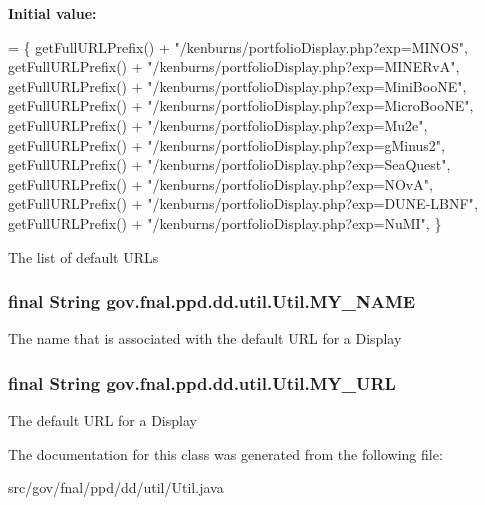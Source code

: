 {\bfseries Initial value\-:}
\begin{DoxyCode}
= \{ getFullURLPrefix() + \textcolor{stringliteral}{"/kenburns/portfolioDisplay.php?exp=MINOS"},
            getFullURLPrefix() + \textcolor{stringliteral}{"/kenburns/portfolioDisplay.php?exp=MINERvA"},
            getFullURLPrefix() + \textcolor{stringliteral}{"/kenburns/portfolioDisplay.php?exp=MiniBooNE"},
            getFullURLPrefix() + \textcolor{stringliteral}{"/kenburns/portfolioDisplay.php?exp=MicroBooNE"},
            getFullURLPrefix() + \textcolor{stringliteral}{"/kenburns/portfolioDisplay.php?exp=Mu2e"},
            getFullURLPrefix() + \textcolor{stringliteral}{"/kenburns/portfolioDisplay.php?exp=gMinus2"},
            getFullURLPrefix() + \textcolor{stringliteral}{"/kenburns/portfolioDisplay.php?exp=SeaQuest"},
            getFullURLPrefix() + \textcolor{stringliteral}{"/kenburns/portfolioDisplay.php?exp=NOvA"},
            getFullURLPrefix() + \textcolor{stringliteral}{"/kenburns/portfolioDisplay.php?exp=DUNE-LBNF"},
            getFullURLPrefix() + \textcolor{stringliteral}{"/kenburns/portfolioDisplay.php?exp=NuMI"},                                                     
             \}
\end{DoxyCode}
The list of default U\-R\-Ls \hypertarget{classgov_1_1fnal_1_1ppd_1_1dd_1_1util_1_1Util_a4af012a0cfec47b3afe394f07e681bbb}{
\subsubsection[{M\-Y\-\_\-\-N\-A\-M\-E}]{\setlength{\rightskip}{0pt plus 5cm}final String gov.\-fnal.\-ppd.\-dd.\-util.\-Util.\-M\-Y\-\_\-\-N\-A\-M\-E\hspace{0.3cm}{\ttfamily [static]}}}\label{classgov_1_1fnal_1_1ppd_1_1dd_1_1util_1_1Util_a4af012a0cfec47b3afe394f07e681bbb}
The name that is associated with the default U\-R\-L for a Display \hypertarget{classgov_1_1fnal_1_1ppd_1_1dd_1_1util_1_1Util_a88e9a358bc6bc125fea7a6a32cd6a2b2}{
\subsubsection[{M\-Y\-\_\-\-U\-R\-L}]{\setlength{\rightskip}{0pt plus 5cm}final String gov.\-fnal.\-ppd.\-dd.\-util.\-Util.\-M\-Y\-\_\-\-U\-R\-L\hspace{0.3cm}{\ttfamily [static]}}}\label{classgov_1_1fnal_1_1ppd_1_1dd_1_1util_1_1Util_a88e9a358bc6bc125fea7a6a32cd6a2b2}
The default U\-R\-L for a Display 

The documentation for this class was generated from the following file\-:\begin{DoxyCompactItemize}
\item 
src/gov/fnal/ppd/dd/util/Util.\-java\end{DoxyCompactItemize}
